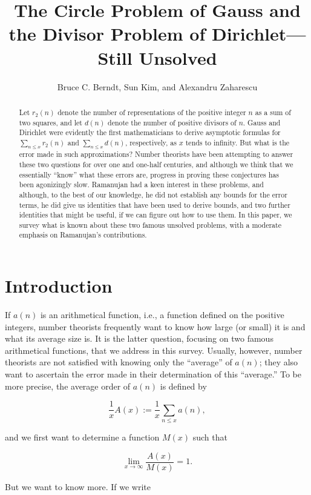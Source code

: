 \documentclass[10pt]{article}
\title{The Circle Problem of Gauss and the Divisor Problem of Dirichlet---Still Unsolved}
\author{Bruce C. Berndt, Sun Kim, and Alexandru Zaharescu}
\date{}
\theoremstyle{plain}
\begin{document}
\maketitle


\begin{abstract}
Let $r_{2}(n)$ denote the number of representations of the positive integer $n$ as a sum of two squares, and let $d(n)$ denote the number of positive divisors of $n$. Gauss and Dirichlet were evidently the first mathematicians to derive asymptotic formulas for $\sum_{n \leq x} r_{2}(n)$ and $\sum_{n \leq x} d(n)$, respectively, as $x$ tends to infinity. But what is the error made in such approximations? Number theorists have been attempting to answer these two questions for over one and one-half centuries, and although we think that we essentially ``know'' what these errors are, progress in proving these conjectures has been agonizingly slow. Ramanujan had a keen interest in these problems, and although, to the best of our knowledge, he did not establish any bounds for the error terms, he did give us identities that have been used to derive bounds, and two further identities that might be useful, if we can figure out how to use them. In this paper, we survey what is known about these two famous unsolved problems, with a moderate emphasis on Ramanujan's contributions.
\end{abstract}

\section{Introduction}

If $a(n)$ is an arithmetical function, i.e., a function defined on the positive integers, number theorists frequently want to know how large (or small) it is and what its average size is. It is the latter question, focusing on two famous arithmetical functions, that we address in this survey. Usually, however, number theorists are not satisfied with knowing only the ``average'' of $a(n)$; they also want to ascertain the error made in their determination of this ``average.'' To be more precise, the average order of $a(n)$ is defined by

$$
\frac{1}{x} A(x):=\frac{1}{x} \sum_{n \leq x} a(n),
$$

and we first want to determine a function $M(x)$ such that

$$
\lim _{x \to \infty} \frac{A(x)}{M(x)}=1 .
$$

But we want to know more. If we write
\end{document}
